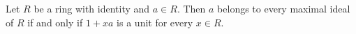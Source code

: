 Let $R$ be a ring with identity and $a \in R$. Then $a$ belongs to every maximal ideal of $R$ if and only if $1 + xa$ is a unit for every $x \in R$.
